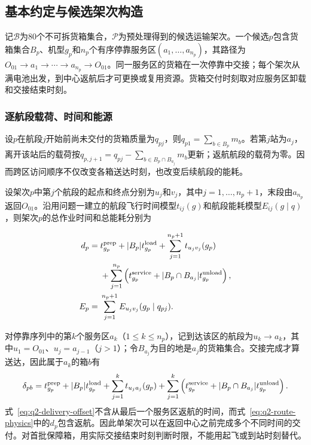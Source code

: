 \documentclass[bwprint,fontset=fandol]{gmcmthesis}
\begin{document}
\subsection{基本约定与候选架次构造}
记$\mathcal B$为80个不可拆货箱集合，$\mathcal P$为预处理得到的候选运输架次。一个候选$p$包含货箱集合$B_p$、机型$g_p$和$n_p$个有序停靠服务区$(a_1,\ldots,a_{n_p})$，其路径为$O_{01}\to a_1\to\cdots\to a_{n_p}\to O_{01}$。同一服务区的货箱在一次停靠中交接；每个架次从满电池出发，到中心返航后才可更换或复用资源。货箱交付时刻取对应服务区卸载和交接结束时刻。

\subsubsection{逐航段载荷、时间和能源}

设$p$在航段$j$开始前尚未交付的货箱质量为$q_{pj}$，则$q_{p1}=\sum_{b\in B_p}m_b$。若第$j$站为$a_j$，离开该站后的载荷按$q_{p,j+1}=q_{pj}-\sum_{b\in B_p\cap B_{a_j}}m_b$更新；返航航段的载荷为零。因而跨区访问顺序不仅改变各箱送达时刻，也改变后续航段的能耗。

设架次$p$中第$j$个航段的起点和终点分别为$u_j$和$v_j$，其中$j=1,\ldots,n_p+1$，末段由$a_{n_p}$返回$O_{01}$。沿用问题一建立的航段飞行时间模型$t_{ij}(g)$和航段能耗模型$E_{ij}(g\mid q)$，则架次$p$的总作业时间和总能耗分别为

\begin{equation}
\begin{aligned}
d_p={}&t^{\rm prep}_{g_p}+|B_p|t^{\rm load}_{g_p}
+\sum_{j=1}^{n_p+1}t_{u_jv_j}(g_p)\\
&+\sum_{j=1}^{n_p}
\left(
t^{\rm service}_{g_p}
+|B_p\cap B_{a_j}|t^{\rm unload}_{g_p}
\right),
\\
E_p={}&\sum_{j=1}^{n_p+1}E_{u_jv_j}(g_p\mid q_{pj}).
\end{aligned}
\label{eq:q2-route-physics}
\end{equation}

对停靠序列中的第$k$个服务区$a_k$（$1\le k\le n_p$），记到达该区的航段为$u_k\to a_k$，其中$u_1=O_{01}$、$u_j=a_{j-1}$（$j>1$）；令$B_{a_j}$为目的地是$a_j$的货箱集合。交接完成才算送达，因此属于$a_k$的箱$b$有
\begin{equation}
\delta_{pb}=t^{\rm prep}_{g_p}+|B_p|t^{\rm load}_{g_p}
+\sum_{j=1}^{k}t_{u_j a_j}(g_p)
+\sum_{j=1}^{k}\left(t^{\rm service}_{g_p}
+|B_p\cap B_{a_j}|t^{\rm unload}_{g_p}\right).
\label{eq:q2-delivery-offset}
\end{equation}
式~\eqref{eq:q2-delivery-offset}不含从最后一个服务区返航的时间，而式~\eqref{eq:q2-route-physics}中的$d_p$包含返航。因此单架次可以在返回中心之前完成多个不同时间的交付。对首批保障箱，用实际交接结束时刻判断时限，不能用起飞或到站时刻替代。
\end{document}
